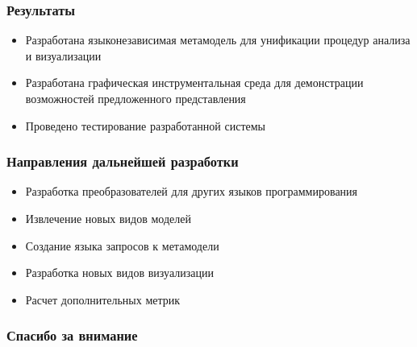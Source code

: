 \documentclass{beamer}
\begin{document}
\begin{frame}
\frametitle{Результаты}

\begin{itemize}
    \item Разработана языконезависимая метамодель для унификации процедур анализа
    и визуализации
    \item Разработана графическая инструментальная среда для демонстрации
    возможностей предложенного представления
    \item Проведено тестирование разработанной системы
\end{itemize}

\end{frame}
\begin{frame}
\frametitle{Направления дальнейшей разработки}

\begin{itemize}
    \item Разработка преобразователей для других языков программирования
    \item Извлечение новых видов моделей
    \item Создание языка запросов к метамодели
    \item Разработка новых видов визуализации
    \item Расчет дополнительных метрик
\end{itemize}

\end{frame}
\begin{frame}
\frametitle{Спасибо за внимание}
\end{frame}
\end{document}
